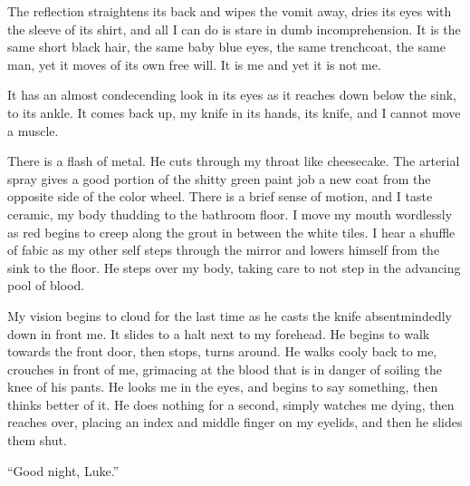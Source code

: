 The reflection straightens its back and wipes the vomit away, dries
its eyes with the sleeve of its shirt, and all I can do is stare in
dumb incomprehension. It is the same short black hair, the same
baby blue eyes, the same trenchcoat, the same man, yet it moves of
its own free will. It is me and yet it is not me.



It has an almost condecending look in its eyes as it reaches down
below the sink, to its ankle. It comes back up, my knife in its
hands, its knife, and I cannot move a muscle.



There is a flash of metal. He cuts through my throat like
cheesecake. The arterial spray gives a good portion of the shitty
green paint job a new coat from the opposite side of the color
wheel. There is a brief sense of motion, and I taste ceramic, my
body thudding to the bathroom floor. I move my mouth wordlessly as
red begins to creep along the grout in between the white tiles. I
hear a shuffle of fabic as my other self steps through the mirror
and lowers himself from the sink to the floor. He steps over my
body, taking care to not step in the advancing pool of blood.



My vision begins to cloud for the last time as he casts the knife
absentmindedly down in front me. It slides to a halt next to my
forehead. He begins to walk towards the front door, then stops,
turns around. He walks cooly back to me, crouches in front of me,
grimacing at the blood that is in danger of soiling the knee of his
pants. He looks me in the eyes, and begins to say something, then
thinks better of it. He does nothing for a second, simply watches
me dying, then reaches over, placing an index and middle finger on
my eyelids, and then he slides them shut.



``Good night, Luke.'' 
 



